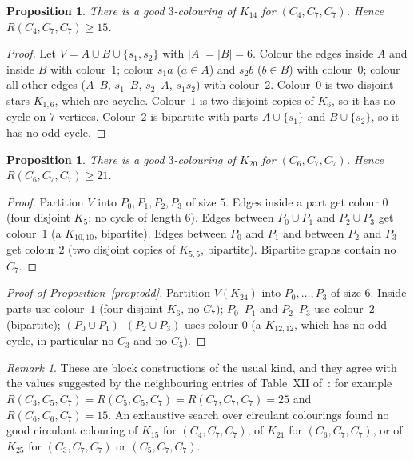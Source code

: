 \documentclass[11pt]{amsart}
\newtheorem{proposition}[theorem]{Proposition}
\theoremstyle{definition}
\theoremstyle{remark}
\newtheorem{remark}[theorem]{Remark}
\begin{document}
\begin{proposition}\label{prop:lb4}
There is a good $3$-colouring of $K_{14}$ for $(C_4,C_7,C_7)$. Hence $R(C_4,C_7,C_7)\ge15$.
\end{proposition}
\begin{proof}
Let $V=A\cup B\cup\{s_1,s_2\}$ with $|A|=|B|=6$. Colour the edges inside $A$ and inside $B$ with colour~$1$; colour $s_1a$ ($a\in A$)
and $s_2b$ ($b\in B$) with colour~$0$; colour all other edges ($A$--$B$, $s_1$--$B$, $s_2$--$A$, $s_1s_2$) with colour~$2$.
Colour~$0$ is two disjoint stars $K_{1,6}$, which are acyclic. Colour~$1$ is two disjoint copies of $K_6$, so it has no cycle on $7$
vertices. Colour~$2$ is bipartite with parts $A\cup\{s_1\}$ and $B\cup\{s_2\}$, so it has no odd cycle.
\end{proof}

\begin{proposition}\label{prop:lb6}
There is a good $3$-colouring of $K_{20}$ for $(C_6,C_7,C_7)$. Hence $R(C_6,C_7,C_7)\ge21$.
\end{proposition}
\begin{proof}
Partition $V$ into $P_0,P_1,P_2,P_3$ of size $5$. Edges inside a part get colour $0$ (four disjoint $K_5$; no cycle of length
$6$). Edges between $P_0\cup P_1$ and $P_2\cup P_3$ get colour~$1$ (a $K_{10,10}$, bipartite). Edges between $P_0$ and $P_1$ and between $P_2$
and $P_3$ get colour $2$ (two disjoint copies of $K_{5,5}$, bipartite). Bipartite graphs contain no $C_7$.
\end{proof}

\begin{proof}[Proof of Proposition~\ref{prop:odd}]
Partition $V(K_{24})$ into $P_0,\dots,P_3$ of size $6$. Inside parts use colour~$1$ (four disjoint $K_6$, no $C_7$);
$P_0$--$P_1$ and $P_2$--$P_3$ use colour~$2$ (bipartite); $(P_0\cup P_1)$--$(P_2\cup P_3)$ uses colour $0$ (a $K_{12,12}$, which has
no odd cycle, in particular no $C_3$ and no $C_5$).
\end{proof}

\begin{remark}
These are block constructions of the usual kind, and they agree with the values suggested by the neighbouring entries of Table~XII
of~\cite{Rad}: for example $R(C_3,C_5,C_7)=R(C_5,C_5,C_7)=R(C_7,C_7,C_7)=25$ and $R(C_6,C_6,C_7)=15$. An exhaustive search over
circulant colourings found no good circulant colouring of $K_{15}$ for $(C_4,C_7,C_7)$, of $K_{21}$ for $(C_6,C_7,C_7)$, or of
$K_{25}$ for $(C_3,C_7,C_7)$ or $(C_5,C_7,C_7)$.
\end{remark}
\end{document}
